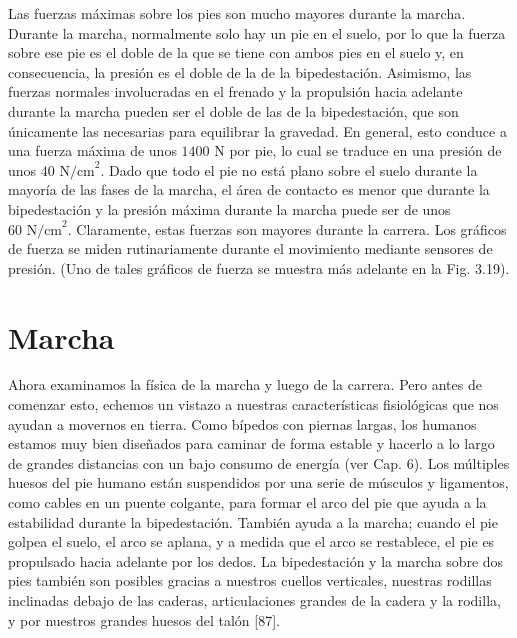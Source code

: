 \documentclass[12pt]{book}
\begin{document}
Las fuerzas máximas sobre los pies son mucho mayores durante la marcha. Durante la marcha, normalmente solo hay un pie en el suelo, por lo que la fuerza sobre ese pie es el doble de la que se tiene con ambos pies en el suelo y, en consecuencia, la presión es el doble de la de la bipedestación. Asimismo, las fuerzas normales involucradas en el frenado y la propulsión hacia adelante durante la marcha pueden ser el doble de las de la bipedestación, que son únicamente las necesarias para equilibrar la gravedad. En general, esto conduce a una fuerza máxima de unos $1400\text{ N}$ por pie, lo cual se traduce en una presión de unos $40\text{ N/cm}^2$. Dado que todo el pie no está plano sobre el suelo durante la mayoría de las fases de la marcha, el área de contacto es menor que durante la bipedestación y la presión máxima durante la marcha puede ser de unos $60\text{ N/cm}^2$. Claramente, estas fuerzas son mayores durante la carrera. Los gráficos de fuerza se miden rutinariamente durante el movimiento mediante sensores de presión. (Uno de tales gráficos de fuerza se muestra más adelante en la Fig. 3.19).

\section{Marcha}

Ahora examinamos la física de la marcha y luego de la carrera. Pero antes de comenzar esto, echemos un vistazo a nuestras características fisiológicas que nos ayudan a movernos en tierra. Como bípedos con piernas largas, los humanos estamos muy bien diseñados para caminar de forma estable y hacerlo a lo largo de grandes distancias con un bajo consumo de energía (ver Cap. 6). Los múltiples huesos del pie humano están suspendidos por una serie de músculos y ligamentos, como cables en un puente colgante, para formar el arco del pie que ayuda a la estabilidad durante la bipedestación. También ayuda a la marcha; cuando el pie golpea el suelo, el arco se aplana, y a medida que el arco se restablece, el pie es propulsado hacia adelante por los dedos. La bipedestación y la marcha sobre dos pies también son posibles gracias a nuestros cuellos verticales, nuestras rodillas inclinadas debajo de las caderas, articulaciones grandes de la cadera y la rodilla, y por nuestros grandes huesos del talón [87].
\end{document}
